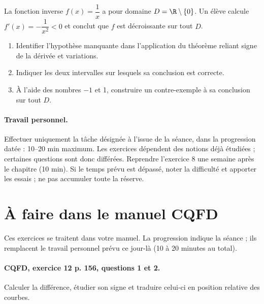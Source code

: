 La fonction inverse $f(x)=\dfrac1x$ a pour domaine $D=\R\setminus\{0\}$. Un élève calcule $f\prime(x)=-\dfrac1{x^2}<0$ et conclut que $f$ est décroissante sur tout $D$.
\begin{enumerate}[label=\arabic*.]
\item Identifier l’hypothèse manquante dans l’application du théorème reliant signe de la dérivée et variations.
\item Indiquer les deux intervalles sur lesquels sa conclusion est correcte.
\item À l’aide des nombres $-1$ et 1, construire un contre-exemple à sa conclusion sur tout $D$.
\end{enumerate}
\paragraph{Travail personnel.} Effectuer uniquement la tâche désignée à l’issue de la séance, dans la progression datée : 10–20 min maximum. Les exercices dépendent des notions déjà étudiées ; certaines questions sont donc différées. Reprendre l’exercice 8 une semaine après le chapitre (10 min). Si le temps prévu est dépassé, noter la difficulté et apporter les essais ; ne pas accumuler toute la réserve.
\endgroup
{}\section*{À faire dans le manuel CQFD}
Ces exercices se traitent dans votre manuel. La progression indique la séance ; ils remplacent le travail personnel prévu ce jour-là (10 à 20 minutes au total).
\paragraph{CQFD, exercice 12 p. 156, questions 1 et 2.}\label{C06-M1} Calculer la différence, étudier son signe et traduire celui-ci en position relative des courbes.
